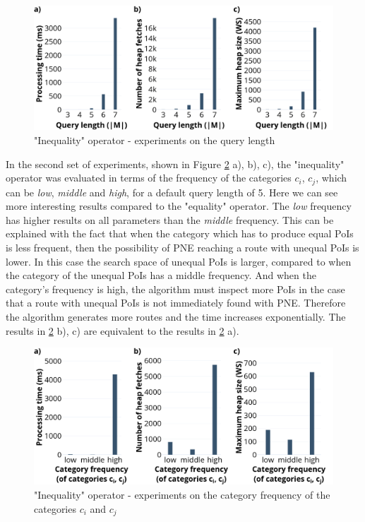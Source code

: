 \begin{figure}[H]
	\includegraphics[scale=0.33]{images/neo_length_30.png}
	\centering
	\caption{"Inequality" operator - experiments on the query length}
	\label{fig:neo_length}
\end{figure}

\enlargethispage{\baselineskip}

In the second set of experiments, shown in Figure \ref{fig:neo_frequency} a), b), c), the "inequality" operator was evaluated in terms of the frequency of the categories $c_i$, $c_j$, which can be \textit{low}, \textit{middle} and \textit{high}, for a default query length of 5.  
Here we can see more interesting results compared to the "equality" operator. The \textit{low} frequency has higher results on all parameters than the \textit{middle} frequency. This can be explained with the fact that when the category which has to produce equal PoIs is less frequent, then the possibility of PNE reaching a route with unequal PoIs is lower. In this case the search space of unequal PoIs is larger, compared to when the category of the unequal PoIs has a middle frequency. And when the category's frequency is high, the algorithm must inspect more PoIs in the case that a route with unequal PoIs is not immediately found with PNE. Therefore the algorithm generates more routes and the time increases exponentially. 
The results in \ref{fig:neo_frequency} b), c) are equivalent to the results in \ref{fig:neo_frequency} a). 

\pagebreak

\begin{figure}[H]
	\includegraphics[scale=0.33]{images/neo_frequency_30.png}
	\centering
	\caption{"Inequality" operator - experiments on the category frequency of the categories $c_i$ and $c_j$}
	\label{fig:neo_frequency}
\end{figure}

